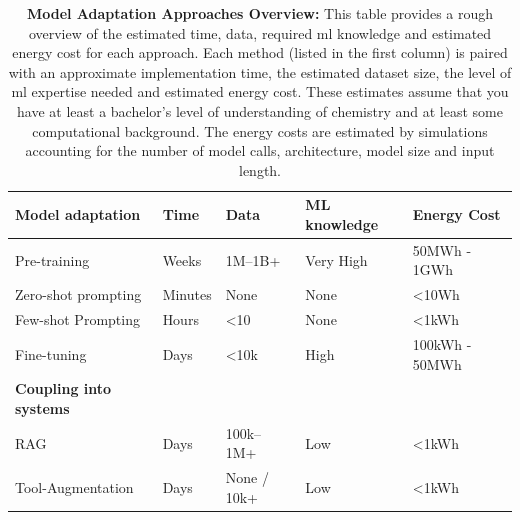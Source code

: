 \begin{table}[!ht]
    \centering
    \caption{\textbf{Model Adaptation Approaches Overview:} This table provides a rough overview of the estimated time, data, required \gls{ml} knowledge and estimated energy cost for each approach. Each method (listed in the first column) is paired with an approximate implementation time, the estimated dataset size, the level of \gls{ml} expertise needed and estimated energy cost.  These estimates assume that you have at least a bachelor's level of understanding of chemistry and at least some computational background. The energy costs are estimated by simulations \cite{ozcan2025quantifying, luccioni2024light} accounting for the number of model calls, architecture, model size and input length.}
\begin{tabular}{lllll}
\toprule
    \textbf{Model adaptation}  & \textbf{Time}    & \textbf{Data}   & \textbf{ML knowledge} & 
    \textbf{Energy Cost} \\ 
\midrule
Pre-training       & Weeks   & 1M--1B+      & Very High & 50MWh - 1GWh  \\
Zero-shot prompting & Minutes & None        & None & \textless 10Wh \\
Few-shot Prompting   & Hours   & \textless 10 & None  & \textless 1kWh  \\
Fine-tuning         & Days    & \textless 10k         & High     &   100kWh - 50MWh  \\
\toprule
    \textbf{Coupling into systems} \\ 
\midrule
RAG                & Days    & 100k--1M+    & Low     &   \textless 1kWh   \\
Tool-Augmentation   & Days    & None / 10k+ & Low     &  \textless 1kWh  \\
\bottomrule
\end{tabular}
    \label{tab:model_adaptation}
\end{table}